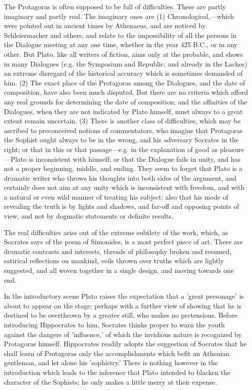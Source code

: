 \documentclass[11pt,letter]{article}
\begin{document}
\par  The Protagoras is often supposed to be full of difficulties. These are partly imaginary and partly real. The imaginary ones are (1) Chronological,—which were pointed out in ancient times by Athenaeus, and are noticed by Schleiermacher and others, and relate to the impossibility of all the persons in the Dialogue meeting at any one time, whether in the year 425 B.C., or in any other. But Plato, like all writers of fiction, aims only at the probable, and shows in many Dialogues (e.g. the Symposium and Republic, and already in the Laches) an extreme disregard of the historical accuracy which is sometimes demanded of him. (2) The exact place of the Protagoras among the Dialogues, and the date of composition, have also been much disputed. But there are no criteria which afford any real grounds for determining the date of composition; and the affinities of the Dialogues, when they are not indicated by Plato himself, must always to a great extent remain uncertain. (3) There is another class of difficulties, which may be ascribed to preconceived notions of commentators, who imagine that Protagoras the Sophist ought always to be in the wrong, and his adversary Socrates in the right; or that in this or that passage—e.g. in the explanation of good as pleasure—Plato is inconsistent with himself; or that the Dialogue fails in unity, and has not a proper beginning, middle, and ending. They seem to forget that Plato is a dramatic writer who throws his thoughts into both sides of the argument, and certainly does not aim at any unity which is inconsistent with freedom, and with a natural or even wild manner of treating his subject; also that his mode of revealing the truth is by lights and shadows, and far-off and opposing points of view, and not by dogmatic statements or definite results.

\par  The real difficulties arise out of the extreme subtlety of the work, which, as Socrates says of the poem of Simonides, is a most perfect piece of art. There are dramatic contrasts and interests, threads of philosophy broken and resumed, satirical reflections on mankind, veils thrown over truths which are lightly suggested, and all woven together in a single design, and moving towards one end.

\par  In the introductory scene Plato raises the expectation that a 'great personage' is about to appear on the stage; perhaps with a further view of showing that he is destined to be overthrown by a greater still, who makes no pretensions. Before introducing Hippocrates to him, Socrates thinks proper to warn the youth against the dangers of 'influence,' of which the invidious nature is recognized by Protagoras himself. Hippocrates readily adopts the suggestion of Socrates that he shall learn of Protagoras only the accomplishments which befit an Athenian gentleman, and let alone his 'sophistry.' There is nothing however in the introduction which leads to the inference that Plato intended to blacken the character of the Sophists; he only makes a little merry at their expense.
\end{document}
